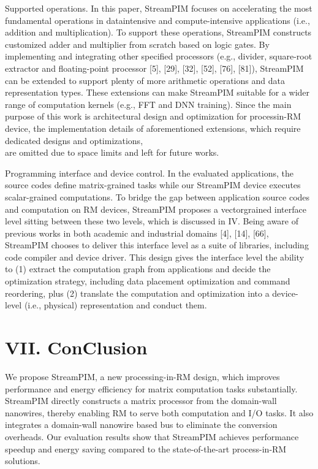 \documentclass[10pt]{article}
\begin{document}
Supported operations. In this paper, StreamPIM focuses on accelerating the most fundamental operations in dataintensive and compute-intensive applications (i.e., addition and multiplication). To support these operations, StreamPIM constructs customized adder and multiplier from scratch based on logic gates. By implementing and integrating other specified processors (e.g., divider, square-root extractor and floating-point processor [5], [29], [32], [52], [76], [81]), StreamPIM can be extended to support plenty of more arithmetic operations and data representation types. These extensions can make StreamPIM suitable for a wider range of computation kernels (e.g., FFT and DNN training). Since the main purpose of this work is architectural design and optimization for processin-RM device, the implementation details of aforementioned extensions, which require dedicated designs and optimizations,\\
are omitted due to space limits and left for future works.

Programming interface and device control. In the evaluated applications, the source codes define matrix-grained tasks while our StreamPIM device executes scalar-grained computations. To bridge the gap between application source codes and computation on RM devices, StreamPIM proposes a vectorgrained interface level sitting between these two levels, which is discussed in IV. Being aware of previous works in both academic and industrial domains [4], [14], [66], StreamPIM chooses to deliver this interface level as a suite of libraries, including code compiler and device driver. This design gives the interface level the ability to (1) extract the computation graph from applications and decide the optimization strategy, including data placement optimization and command reordering, plus (2) translate the computation and optimization into a device-level (i.e., physical) representation and conduct them.

\section*{VII. ConClusion}
We propose StreamPIM, a new processing-in-RM design, which improves performance and energy efficiency for matrix computation tasks substantially. StreamPIM directly constructs a matrix processor from the domain-wall nanowires, thereby enabling RM to serve both computation and I/O tasks. It also integrates a domain-wall nanowire based bus to eliminate the conversion overheads. Our evaluation results show that StreamPIM achieves performance speedup and energy saving compared to the state-of-the-art process-in-RM solutions.
\end{document}
